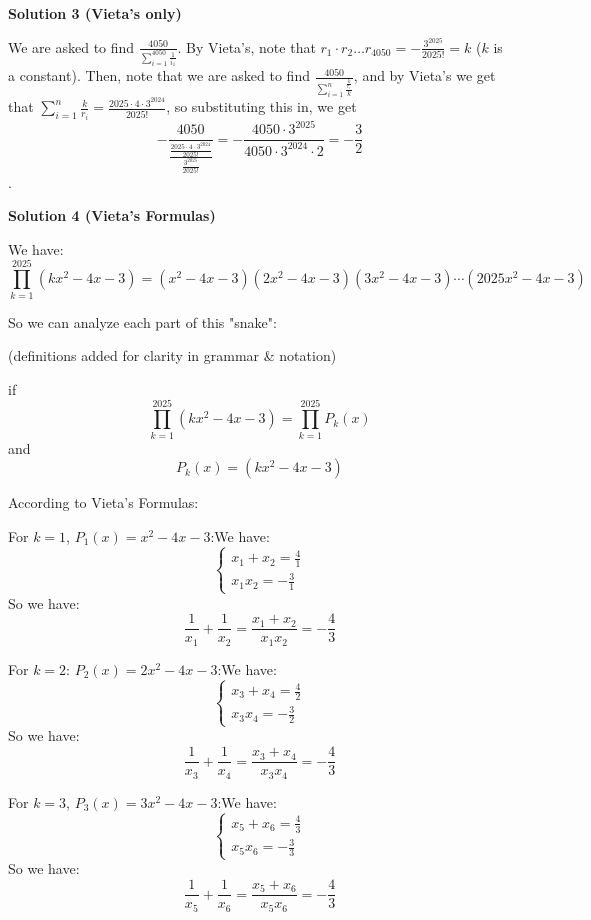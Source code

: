 \begin{enumerate}
 



\textbf{Solution 3 (Vieta's only)}

We are asked to find $\frac{4050}{\sum_{i=1}^{4050}\frac{1}{i_1}}$. By Vieta's, note that $r_1 \cdot r_2 \dots r_{4050} = -\frac{3^{2025}}{2025!} = k$ ($k$ is a constant). Then, note that we are asked to find $\frac{4050}{\sum_{i=1}^n \frac{\frac{k}{r_i}}{k}}$, and by Vieta's we get that $\sum_{i=1}^n \frac{k}{r_i} = \frac{2025 \cdot 4 \cdot 3^{2024}}{2025!}$, so substituting this in, we get 
 \[-\frac{4050}{\frac{\frac{2025 \cdot 4 \cdot 3^{2024}}{2025!}}{\frac{3^{2025}}{2025!}}} = -\frac{4050 \cdot 3^{2025}}{4050 \cdot 3^{2024} \cdot 2} = \boxed{-\frac{3}{2}}\].

 


 



\textbf{Solution 4 (Vieta's Formulas)}

We have: 
 \[\prod_{k = 1}^{2025} (kx^{2} - 4x - 3) = (x^{2} - 4x - 3)(2x^{2} - 4x - 3)(3x^{2} - 4x - 3) \cdots (2025x^{2} - 4x - 3)\]

 So we can analyze each part of this "snake":

 (definitions added for clarity in grammar & notation)

 if 
 \[\prod_{k = 1}^{2025} (kx^{2} - 4x - 3)=\prod_{k = 1}^{2025} P_k(x)\]and
 \[P_k(x)= (kx^{2} - 4x - 3)\]

 According to Vieta's Formulas:

 For $k=1$, $P_1(x)=x^{2} - 4x - 3$:We have:
 \[\begin{cases}  x_1+x_2=\frac{4}{1}\\ x_1x_2=-\frac{3}{1} \end{cases}\]So we have: 
 \[\dfrac{1}{x_1}+\dfrac{1}{x_2}=\dfrac{x_1+x_2}{x_1x_2}=-\dfrac{4}{3}\]

 For $k=2$: $P_2(x) = 2x^{2} - 4x - 3$:We have:
 \[\begin{cases}  x_3+x_4=\frac{4}{2}\\ x_3x_4=-\frac{3}{2} \end{cases}\]So we have: 
 \[\dfrac{1}{x_3}+\dfrac{1}{x_4}=\dfrac{x_3+x_4}{x_3x_4}=-\dfrac{4}{3}\]

 For $k=3$, $P_3(x)=3x^{2} - 4x - 3$:We have:
 \[\begin{cases}  x_5+x_6=\frac{4}{3}\\ x_5x_6=-\frac{3}{3} \end{cases}\]So we have: 
 \[\dfrac{1}{x_5}+\dfrac{1}{x_6}=\dfrac{x_5+x_6}{x_5x_6}=-\dfrac{4}{3}\]


\end{enumerate}
